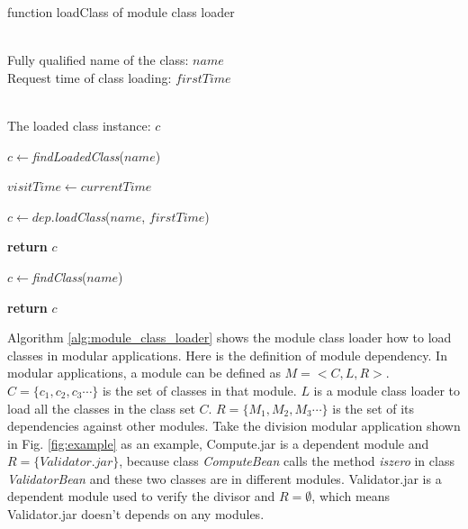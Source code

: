 \documentclass[conference]{IEEEtran}
\begin{document}
\begin{algorithm}[ht]
\caption{function loadClass of module class loader}
\label{alg:module_class_loader}
\begin{algorithmic}[1]
\REQUIRE ~~\\
Fully qualified name of the class: $name$ \\
Request time of class loading: $firstTime$

\ENSURE ~~\\
The loaded class instance: $c$

\STATE $c\leftarrow$\emph{findLoadedClass}($name$)


	\STATE $visitTime\leftarrow currentTime$
	
		
		\STATE $c\leftarrow dep.$\emph{loadClass}($name$, $firstTime$)
		
			
			\STATE \textbf{return} $c$

		\ENDIF
	
	\ENDFOR

	\STATE $c\leftarrow$\emph{findClass}($name$)

\ELSE
	
	\STATE \textbf{return} $c$

\ENDIF


\end{algorithmic}
\end{algorithm}


Algorithm \ref{alg:module_class_loader} shows the module class loader how to load classes in modular applications.
Here is the definition of module dependency.
In modular applications, a module can be defined as $M=<C, L, R>$. 
$C=\{c_1, c_2, c_3\cdots\}$ is the set of classes in that module. 
$L$ is a module class loader to load all the classes in the class set $C$.
$R=\{M_1, M_2, M_3\cdots\}$ is the set of its dependencies against other modules. 
Take the division modular application shown in Fig. \ref{fig:example} as an example, Compute.jar is a dependent module and $R = \{Validator.jar\}$, because class \emph{ComputeBean} calls the method \emph{iszero} in class \emph{ValidatorBean} and these two classes are in different modules.
Validator.jar is a dependent module used to verify the divisor and $R = \emptyset$, which means Validator.jar doesn't depends on any modules.
\end{document}

